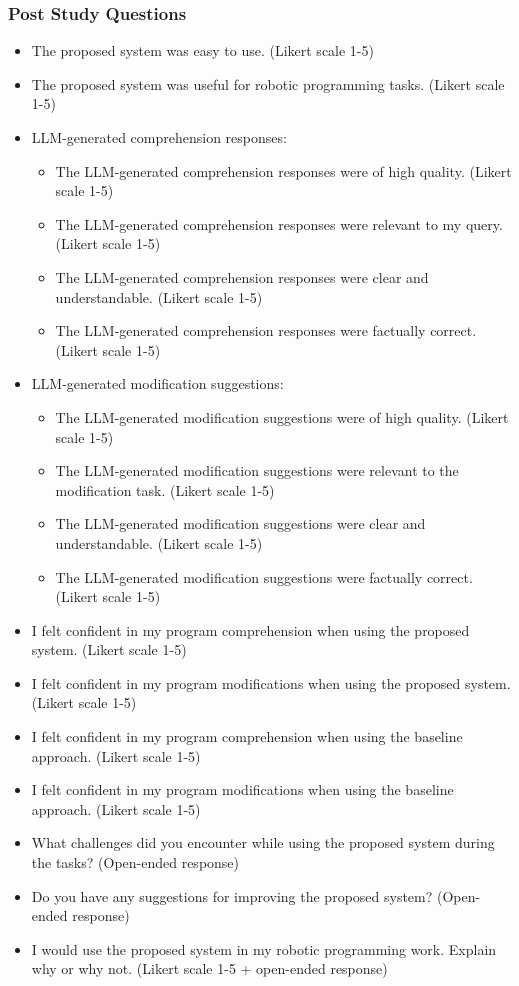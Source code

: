 \subsubsection{Post Study Questions}
\begin{itemize}
    \item The proposed system was easy to use. (Likert scale 1-5)
    \item The proposed system was useful for robotic programming tasks. (Likert scale 1-5)

    \item LLM-generated comprehension responses:
          \begin{itemize}
              \item The LLM-generated comprehension responses were of high quality. (Likert scale 1-5)
              \item The LLM-generated comprehension responses were relevant to my query. (Likert scale 1-5)
              \item The LLM-generated comprehension responses were clear and understandable. (Likert scale 1-5)
              \item The LLM-generated comprehension responses were factually correct. (Likert scale 1-5)
          \end{itemize}

    \item LLM-generated modification suggestions:
          \begin{itemize}
              \item The LLM-generated modification suggestions were of high quality. (Likert scale 1-5)
              \item The LLM-generated modification suggestions were relevant to the modification task. (Likert scale 1-5)
              \item The LLM-generated modification suggestions were clear and understandable. (Likert scale 1-5)
              \item The LLM-generated modification suggestions were factually correct. (Likert scale 1-5)
          \end{itemize}

    \item I felt confident in my program comprehension when using the proposed system. (Likert scale 1-5)
    \item I felt confident in my program modifications when using the proposed system. (Likert scale 1-5)
    \item I felt confident in my program comprehension when using the baseline approach. (Likert scale 1-5)
    \item I felt confident in my program modifications when using the baseline approach. (Likert scale 1-5)

    \item What challenges did you encounter while using the proposed system during the tasks? (Open-ended response)
    \item Do you have any suggestions for improving the proposed system? (Open-ended response)
    \item I would use the proposed system in my robotic programming work. Explain why or why not. (Likert scale 1-5 + open-ended response)
\end{itemize}